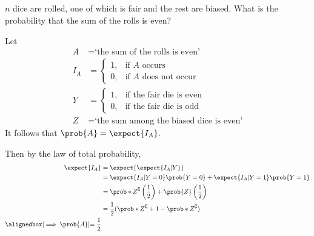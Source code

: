 \documentclass[%
  hwnumber=5,%
  studentnumber=20053722,%
  {name=Bryan Hoang}%
]{%
  mthe353answer%
}
\begin{document}
\begin{questions}
\begin{parts}
      \part{}
      \(n\) dice are rolled, one of which is fair and the rest are biased.  What is
      the probability that the sum of the rolls is even?
      \begin{solution}
        Let
        \begin{align*}
          A &= \text{`the sum of the rolls is even'}\\
          I_A &= \begin{cases}
            1, & \text{if \(A\) occurs}\\
            0, & \text{if \(A\) does not occur}
          \end{cases}\\
          Y &= \begin{cases}
            1, & \text{if the fair die is even}\\
            0, & \text{if the fair die is odd}
          \end{cases}\\
          Z &= \text{`the sum among the biased dice is even'}
        \end{align*}
        It follows that \(\prob{A} = \expect{I_A}\).

        Then by the law of total probability,
        \begin{align*}
          \expect{I_A} &= \expect{\expect{I_A|Y}}\\
          &= \expect{I_A|Y=0}\prob{Y=0} + \expect{I_A|Y=1}\prob{Y=1}\\
          &= \prob*{Z^\complement}\left(\frac{1}{2}\right) + \prob{Z}\left(\frac{1}{2}\right)\\
          &= \frac{1}{2}(\prob*{Z^\complement}+1-\prob*{Z^\complement})\\
          \alignedbox[\implies \prob{A}]{= \frac{1}{2}}
        \end{align*}
      \end{solution}
    \end{parts}
  \end{questions}
\end{document}
